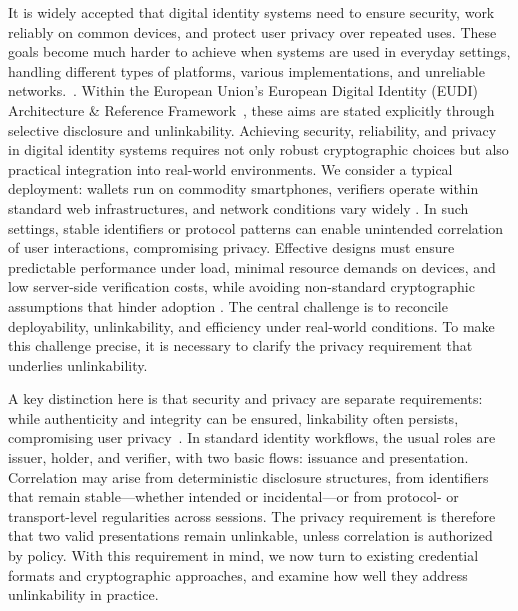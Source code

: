 
It is widely accepted that digital identity systems need to ensure security, work reliably on common devices, and protect user privacy over repeated uses. These goals become much harder to achieve when systems are used in everyday settings, handling different types of platforms, various implementations, and unreliable networks.~\cite{PoPETS:KruPaiRujKan24}. Within the European Union’s European Digital Identity (EUDI) Architecture \& Reference Framework~\cite{EU:EUDI23}, these aims are stated explicitly through selective disclosure and unlinkability. Achieving security, reliability, and privacy in digital identity systems requires not only robust cryptographic choices but also practical integration into real-world environments. We consider a typical deployment: wallets run on commodity smartphones, verifiers operate within standard web infrastructures, and network conditions vary widely \cite{EU:EUDI23}. In such settings, stable identifiers or protocol patterns can enable unintended correlation of user interactions, compromising privacy. Effective designs must ensure predictable performance under load, minimal resource demands on devices, and low server-side verification costs, while avoiding non-standard cryptographic assumptions that hinder adoption \cite{NIST:Grassi17}. The central challenge is to reconcile deployability, unlinkability, and efficiency under real-world conditions. To make this challenge precise, it is necessary to clarify the privacy requirement that underlies unlinkability.

A key distinction here is that security and privacy are separate requirements: while authenticity and integrity can be ensured, linkability often persists, compromising user privacy~\cite{PoPETS:KruPaiRujKan24,JC:FeiFiaSha88}. In standard identity workflows, the usual roles are issuer, holder, and verifier, with two basic flows: issuance and presentation. Correlation may arise from deterministic disclosure structures, from identifiers that remain stable—whether intended or incidental—or from protocol- or transport-level regularities across sessions. The privacy requirement is therefore that two valid presentations remain unlinkable, unless correlation is authorized by policy. With this requirement in mind, we now turn to existing credential formats and cryptographic approaches, and examine how well they address unlinkability in practice.


